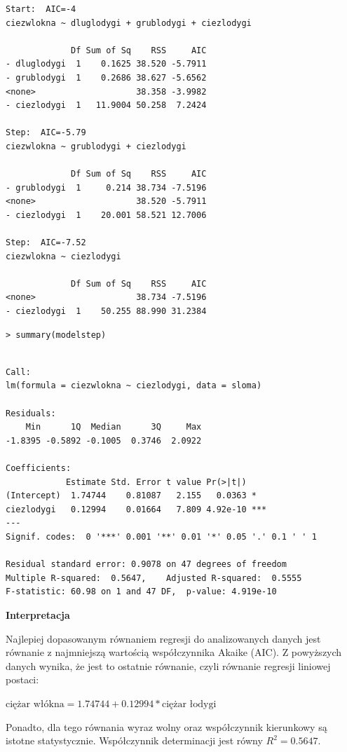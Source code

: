 \documentclass[12pt,B5paper,]{book}
\begin{document}
\begin{verbatim}
Start:  AIC=-4
ciezwlokna ~ dluglodygi + grublodygi + ciezlodygi

             Df Sum of Sq    RSS     AIC
- dluglodygi  1    0.1625 38.520 -5.7911
- grublodygi  1    0.2686 38.627 -5.6562
<none>                    38.358 -3.9982
- ciezlodygi  1   11.9004 50.258  7.2424

Step:  AIC=-5.79
ciezwlokna ~ grublodygi + ciezlodygi

             Df Sum of Sq    RSS     AIC
- grublodygi  1     0.214 38.734 -7.5196
<none>                    38.520 -5.7911
- ciezlodygi  1    20.001 58.521 12.7006

Step:  AIC=-7.52
ciezwlokna ~ ciezlodygi

             Df Sum of Sq    RSS     AIC
<none>                    38.734 -7.5196
- ciezlodygi  1    50.255 88.990 31.2384
\end{verbatim}

\begin{verbatim}
> summary(modelstep)
\end{verbatim}

\begin{verbatim}

Call:
lm(formula = ciezwlokna ~ ciezlodygi, data = sloma)

Residuals:
    Min      1Q  Median      3Q     Max 
-1.8395 -0.5892 -0.1005  0.3746  2.0922 

Coefficients:
            Estimate Std. Error t value Pr(>|t|)    
(Intercept)  1.74744    0.81087   2.155   0.0363 *  
ciezlodygi   0.12994    0.01664   7.809 4.92e-10 ***
---
Signif. codes:  0 '***' 0.001 '**' 0.01 '*' 0.05 '.' 0.1 ' ' 1

Residual standard error: 0.9078 on 47 degrees of freedom
Multiple R-squared:  0.5647,    Adjusted R-squared:  0.5555 
F-statistic: 60.98 on 1 and 47 DF,  p-value: 4.919e-10
\end{verbatim}

\vspace{0.8cm} \textbf{Interpretacja}

Najlepiej dopasowanym równaniem regresji do analizowanych danych jest
równanie z najmniejszą wartością współczynnika Akaike (AIC). Z
powyższych danych wynika, że jest to ostatnie równanie, czyli równanie
regresji liniowej postaci:

\(\textrm{ciężar włókna} = 1.74744 + 0.12994*\textrm{ciężar łodygi}\)

Ponadto, dla tego równania wyraz wolny oraz współczynnik kierunkowy są
istotne statystycznie. Współczynnik determinacji jest równy
\(R^2=0.5647\).
\end{document}
